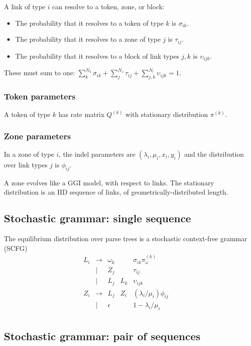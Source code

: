 \documentclass{article}
\begin{document}
A link of type $i$ can resolve to a token, zone, or block:
\begin{itemize}
\item
The probability that it resolves to a token of type $k$ is $\sigma_{ik}$.
\item
The probability that it resolves to a zone of type $j$ is $\tau_{ij}$.
\item
The probability that it resolves to a block of link types $j,k$ is $\upsilon_{ijk}$.
\end{itemize}
These must sum to one: $\sum_k^{N_k}\sigma_{ik} + \sum_j^{N_z}\tau_{ij} + \sum_{j,k}^{N_l}\upsilon_{ijk} = 1$.

\subsubsection{Token parameters}

A token of type $k$ has rate matrix $Q^{(k)}$ with stationary distribution $\pi^{(k)}$.

\subsubsection{Zone parameters}

In a zone of type $i$, the indel parameters are $(\lambda_i,\mu_i,x_i,y_i)$
and the distribution over link types $j$ is $\phi_{ij}$.

A zone evolves like a GGI model, with respect to links.
The stationary distribution is an IID sequence of links, of geometrically-distributed length.

\subsection{Stochastic grammar: single sequence}

The equilibrium distribution over parse trees is a stochastic context-free grammar (SCFG)
\[
\begin{array}{rclll}
  L_i & \to & \omega_k & & \sigma_{ik} \pi^{(k)}_{\omega} \\
      & | & Z_j & & \tau_{ij} \\
      & | & L_j & L_k & \upsilon_{ijk} \\
  Z_i & \to & L_j & Z_i & (\lambda_i/\mu_i) \phi_{ij} \\
        & | & \epsilon & & 1 - \lambda_i/\mu_i \\
\end{array}
\]

\subsection{Stochastic grammar: pair of sequences}
\end{document}
